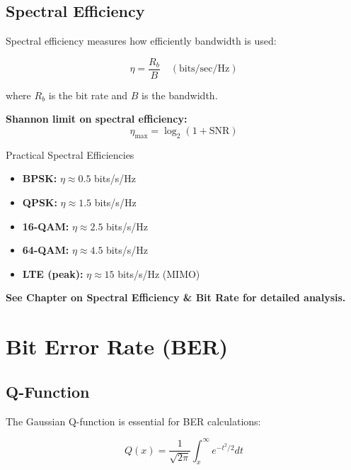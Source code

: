 \subsection{Spectral Efficiency}
\label{subsec:spectral-efficiency}

Spectral efficiency measures how efficiently bandwidth is used:

\begin{equation}
\label{eq:spectral-efficiency}
\eta = \frac{R_b}{B} \quad (\text{bits/sec/Hz})
\end{equation}

where $R_b$ is the bit rate and $B$ is the bandwidth.

\textbf{Shannon limit on spectral efficiency:}
\begin{equation}
\label{eq:spectral-efficiency-max}
\eta_{\max} = \log_2(1 + \text{SNR})
\end{equation}

\begin{calloutbox}{Practical Spectral Efficiencies}
\begin{itemize}
\item \textbf{BPSK:} $\eta \approx 0.5$ bits/s/Hz
\item \textbf{QPSK:} $\eta \approx 1.5$ bits/s/Hz
\item \textbf{16-QAM:} $\eta \approx 2.5$ bits/s/Hz
\item \textbf{64-QAM:} $\eta \approx 4.5$ bits/s/Hz
\item \textbf{LTE (peak):} $\eta \approx 15$ bits/s/Hz (MIMO)
\end{itemize}
\end{calloutbox}

\textbf{See Chapter on Spectral Efficiency \& Bit Rate for detailed analysis.}

\section{Bit Error Rate (BER)}
\label{sec:ber}

\subsection{Q-Function}
\label{subsec:q-function}

The Gaussian Q-function is essential for BER calculations:

\begin{equation}
\label{eq:q-function}
Q(x) = \frac{1}{\sqrt{2\pi}} \int_x^\infty e^{-t^2/2} dt
\end{equation}

